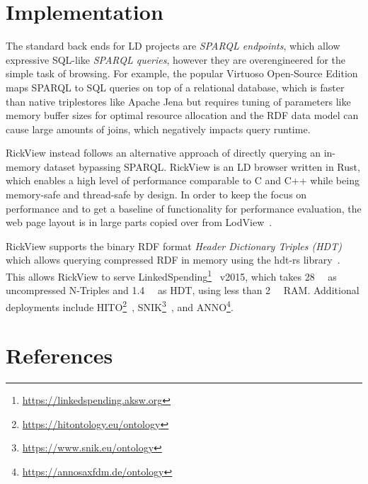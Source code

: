 \documentclass[a4paper,10pt]{article}
\begin{document}
\section{Implementation}\label{implementation}

The standard back ends for LD projects are \emph{SPARQL endpoints}, which allow expressive SQL-like \emph{SPARQL queries}, however they are overengineered for the simple task of browsing.
For example, the popular Virtuoso Open-Source Edition maps SPARQL to SQL queries on top of a relational database, which is faster than native triplestores like Apache Jena but requires tuning of parameters like memory buffer sizes for optimal resource allocation and the RDF data model can cause large amounts of joins, which negatively impacts query runtime.

RickView instead follows an alternative approach of directly querying an in-memory dataset bypassing SPARQL.
RickView is an LD browser written in Rust, which enables a high level of performance comparable to C and C++ while being memory-safe and thread-safe by design.
In order to keep the focus on performance and to get a baseline of functionality for performance evaluation, the web page layout is in large parts copied
over from LodView~\citep{lodview,adaptinglodview}.

RickView supports the binary RDF format \emph{Header Dictionary Triples (HDT)}~\citep{hdt2012} which allows querying compressed RDF in memory using the hdt-rs library~\citep{hdtrs}.
This allows RickView to serve LinkedSpending\footnote{\url{https://linkedspending.aksw.org}}~\citep{linkedspending} v2015, which takes \SI{28}{\giga\byte} as uncompressed N-Triples and \SI{1.4}{\giga\byte} as HDT, using less than \SI{2}{\giga\byte} RAM.
%
Additional deployments include HITO\footnote{\url{https://hitontology.eu/ontology}}~\citep{hito}, SNIK\footnote{\url{https://www.snik.eu/ontology}}~\citep{snik},
 and ANNO\footnote{\url{https://annosaxfdm.de/ontology}}.

\section{References}\label{references}



\end{document}
